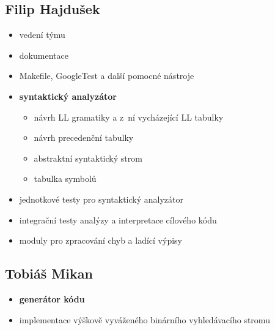 \documentclass[a4paper, 11pt]{article}
\begin{document}
        \subsection*{Filip Hajdušek}
        \vspace{-0.5em}
            \begin{itemize}
                \setlength{\itemsep}{-2pt}

                \item vedení týmu
                \item dokumentace
                \item Makefile, GoogleTest a další pomocné nástroje

                \item \textbf{syntaktický analyzátor}
                    \begin{itemize}
                        \vspace{-6pt}
                        \item[-] návrh LL gramatiky a z~ní vycházející LL tabulky
                        \item[-] návrh precedenční tabulky
                        \item[-] abstraktní syntaktický strom
                        \item[-] tabulka symbolů
                        \vspace{-4pt}
                    \end{itemize}

                \item jednotkové testy pro syntaktický analyzátor
                \item integrační testy analýzy a interpretace cílového kódu
                \item moduly pro zpracování chyb a ladící výpisy

            \end{itemize}

        \vspace{-1.4em}
        \subsection*{Tobiáš Mikan}
        \vspace{-0.5em}
            \begin{itemize}
                \setlength{\itemsep}{-2pt}

                \item \textbf{generátor kódu}
                \item implementace výškově vyváženého binárního vyhledávacího stromu

            \end{itemize}
\end{document}
